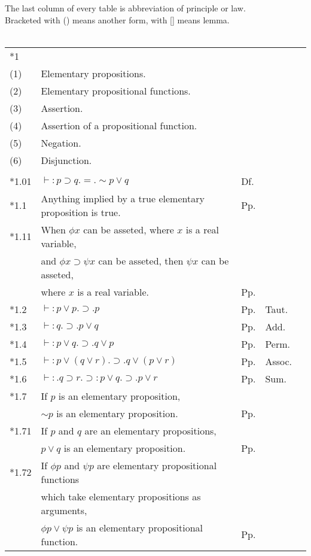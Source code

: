 \noindent The last column of every table is abbreviation of principle or law.\\
Bracketed with () means another form, with [] means lemma.\\
\\
\begin{tabular}[t]{l@{\quad}l@{\quad}l@{\quad}ll}
{*1} \\
(1) & {Elementary propositions.} \\
(2) & {Elementary propositional functions.} \\
(3) & {Assertion.} \\
(4) & {Assertion of a propositional function.} \\
(5) & {Negation.} \\
(6) & {Disjunction.} \\\\
{*1.01} & $\vdash:p\supset{q}.=.\sim{p}\vee{q}\quad$ & Df.\\
{*1.1} & Anything implied by a true elementary proposition is true. & Pp.\\
{*1.11} & When $\phi{x}$ can be asseted, where $x$ is a real variable,\\
& and $\phi{x} \supset \psi{x}$ can be asseted, then $\psi{x}$ can be asseted,\\
& where $x$ is a real variable. & Pp.\\
{*1.2} & $\vdash:p\vee p . \supset . p$ & Pp. & Taut.\\
{*1.3} & $\vdash:q.\supset . p \vee q$ & Pp. & Add.\\
{*1.4} & $\vdash:p\vee q . \supset . q \vee p$ & Pp. & Perm.\\
{*1.5} & $\vdash:p\vee (q \vee r) . \supset . q \vee (p \vee r)$ & Pp. & Assoc.\\
{*1.6} & $\vdash:.q\supset r . \supset : p \vee q . \supset . p \vee r$ & Pp. & Sum.\\
{*1.7} & If $p$ is an elementary proposition,\\
& $\sim{p}$ is an elementary proposition. & Pp.\\
{*1.71} & If $p$ and $q$ are an elementary propositions,\\
& $p \vee q$ is an elementary proposition. & Pp.\\
{*1.72} & If $\phi{p}$ and $\psi{p}$ are elementary propositional functions\\
& which take elementary propositions as arguments,\\
& $\phi{p}\vee\psi{p}$ is an elementary propositional function. & Pp.\\

\end{tabular}
